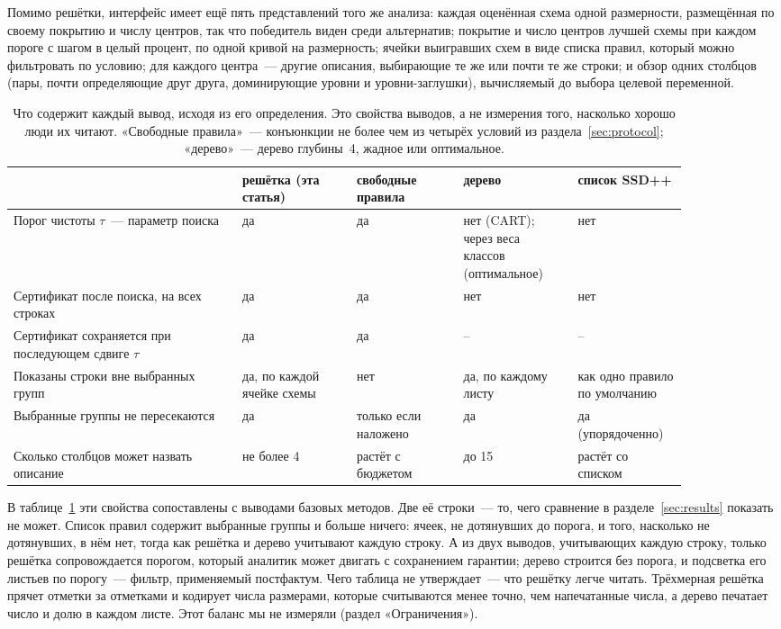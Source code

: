 \documentclass[11pt]{article}
\begin{document}
Помимо решётки, интерфейс имеет ещё пять представлений того же анализа: каждая оценённая схема одной размерности, размещённая по своему покрытию и числу центров, так что победитель виден среди альтернатив; покрытие и число центров лучшей схемы при каждом пороге с шагом в целый процент, по одной кривой на размерность; ячейки выигравших схем в виде списка правил, который можно фильтровать по условию; для каждого центра~--- другие описания, выбирающие те же или почти те же строки; и обзор одних столбцов (пары, почти определяющие друг друга, доминирующие уровни и уровни-заглушки), вычисляемый до выбора целевой переменной.

\begin{table}[t]\centering\footnotesize\setlength{\tabcolsep}{4pt}
\caption{Что содержит каждый вывод, исходя из его определения. Это свойства выводов, а не измерения того, насколько хорошо люди их читают. «Свободные правила»~--- конъюнкции не более чем из четырёх условий из раздела~\ref{sec:protocol}; «дерево»~--- дерево глубины~4, жадное или оптимальное.}\label{tab:properties}
\begin{tabular}{>{\raggedright\arraybackslash}p{0.30\linewidth}>{\raggedright\arraybackslash}p{0.15\linewidth}>{\raggedright\arraybackslash}p{0.14\linewidth}>{\raggedright\arraybackslash}p{0.15\linewidth}>{\raggedright\arraybackslash}p{0.13\linewidth}}
\toprule
& решётка (эта статья) & свободные правила & дерево & список SSD++\\
\midrule
Порог чистоты $\tau$~--- параметр поиска & да & да & нет (CART); через веса классов (оптимальное) & нет\\
Сертификат после поиска, на всех строках & да & да & нет & нет\\
Сертификат сохраняется при последующем сдвиге $\tau$ & да & да & -- & --\\
Показаны строки вне выбранных групп & да, по каждой ячейке схемы & нет & да, по каждому листу & как одно правило по умолчанию\\
Выбранные группы не пересекаются & да & только если наложено & да & да (упорядоченно)\\
Сколько столбцов может назвать описание & не более 4 & растёт с бюджетом & до 15 & растёт со списком\\
\bottomrule
\end{tabular}
\end{table}

В таблице~\ref{tab:properties} эти свойства сопоставлены с выводами базовых методов. Две её строки~--- то, чего сравнение в разделе~\ref{sec:results} показать не может. Список правил содержит выбранные группы и больше ничего: ячеек, не дотянувших до порога, и того, насколько не дотянувших, в нём нет, тогда как решётка и дерево учитывают каждую строку. А из двух выводов, учитывающих каждую строку, только решётка сопровождается порогом, который аналитик может двигать с сохранением гарантии; дерево строится без порога, и подсветка его листьев по порогу~--- фильтр, применяемый постфактум. Чего таблица не утверждает~--- что решётку легче читать. Трёхмерная решётка прячет отметки за отметками и кодирует числа размерами, которые считываются менее точно, чем напечатанные числа, а дерево печатает число и долю в каждом листе. Этот баланс мы не измеряли (раздел «Ограничения»).
\end{document}
